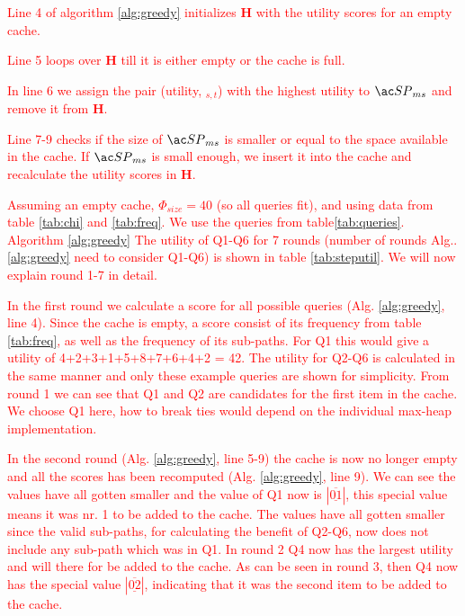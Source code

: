 \textcolor{red}{
Line 4 of algorithm \ref{alg:greedy} initializes \textbf{H} with the utility scores for an empty cache.
}

\textcolor{red}{
Line 5 loops over \textbf{H} till it is either empty or the cache is full. 
}

\textcolor{red}{
In line 6 we assign the pair (utility, \spath$_{s,t}$) with the highest utility to $\spath_{ms}$ and remove it from \textbf{H}.
}

\textcolor{red}{
Line 7-9 checks if the size of $\spath_{ms}$ is smaller or equal to the space available in the cache. If $\spath_{ms}$ is small enough, we insert it into the cache and recalculate the utility scores in \textbf{H}.
}

\textcolor{red}{
Assuming an empty cache, $\Phi_{size}=40$ (so all queries fit), and using data from table \ref{tab:chi} and  \ref{tab:freq}. We use the queries from table\ref{tab:queries}. Algorithm \ref{alg:greedy}  The utility of Q1-Q6 for 7 rounds (number of rounds Alg.. \ref{alg:greedy} need to consider Q1-Q6) is shown in table \ref{tab:steputil}. We will now explain round 1-7 in detail.}

\textcolor{red}{
In the first round we calculate a score for all possible queries (Alg. \ref{alg:greedy}, line 4). Since the cache is empty, a \spath score consist of its frequency from table \ref{tab:freq}, as well as the frequency of its sub-paths. For Q1 this would give a utility of 4+2+3+1+5+8+7+6+4+2 = 42. The utility for Q2-Q6 is calculated in the same manner and only these example queries are shown for simplicity. From round 1 we can see that Q1 and Q2 are candidates for the first item in the cache. We choose Q1 here, how to break ties would depend on the individual max-heap implementation. 
}

\textcolor{red}{
In the second round (Alg. \ref{alg:greedy}, line 5-9) the cache is now no longer empty and all the scores has been recomputed (Alg. \ref{alg:greedy}, line 9). We can see the values have all gotten smaller and the value of Q1 now is $| \underline{\overline{01}}|$, this special value means it was nr. 1 to be added to the cache. The values have all gotten smaller since the valid sub-paths, for calculating the benefit of Q2-Q6, now does not include any sub-path which was in Q1. In round 2 Q4 now has the largest utility and will there for be added to the cache. As can be seen in round 3, then Q4 now has the special value $|\underline{\overline{02}}|$, indicating that it was the second item to be added to the cache.
}

